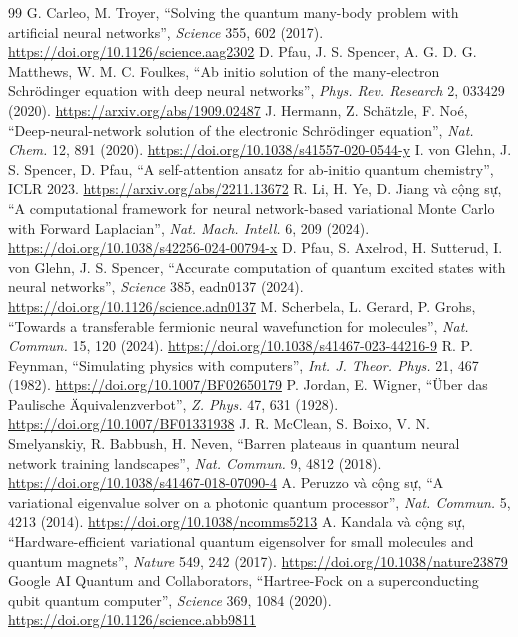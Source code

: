 {\begin{thebibliography}{99}
 G. Carleo, M. Troyer, ``Solving the quantum many-body problem with artificial neural networks'', \emph{Science} 355, 602 (2017). \url{https://doi.org/10.1126/science.aag2302}
 D. Pfau, J. S. Spencer, A. G. D. G. Matthews, W. M. C. Foulkes, ``Ab initio solution of the many-electron Schrödinger equation with deep neural networks'', \emph{Phys. Rev. Research} 2, 033429 (2020). \url{https://arxiv.org/abs/1909.02487}
 J. Hermann, Z. Schätzle, F. Noé, ``Deep-neural-network solution of the electronic Schrödinger equation'', \emph{Nat. Chem.} 12, 891 (2020). \url{https://doi.org/10.1038/s41557-020-0544-y}
 I. von Glehn, J. S. Spencer, D. Pfau, ``A self-attention ansatz for ab-initio quantum chemistry'', ICLR 2023. \url{https://arxiv.org/abs/2211.13672}
 R. Li, H. Ye, D. Jiang và cộng sự, ``A computational framework for neural network-based variational Monte Carlo with Forward Laplacian'', \emph{Nat. Mach. Intell.} 6, 209 (2024). \url{https://doi.org/10.1038/s42256-024-00794-x}
 D. Pfau, S. Axelrod, H. Sutterud, I. von Glehn, J. S. Spencer, ``Accurate computation of quantum excited states with neural networks'', \emph{Science} 385, eadn0137 (2024). \url{https://doi.org/10.1126/science.adn0137}
 M. Scherbela, L. Gerard, P. Grohs, ``Towards a transferable fermionic neural wavefunction for molecules'', \emph{Nat. Commun.} 15, 120 (2024). \url{https://doi.org/10.1038/s41467-023-44216-9}
 R. P. Feynman, ``Simulating physics with computers'', \emph{Int. J. Theor. Phys.} 21, 467 (1982). \url{https://doi.org/10.1007/BF02650179}
 P. Jordan, E. Wigner, ``Über das Paulische Äquivalenzverbot'', \emph{Z. Phys.} 47, 631 (1928). \url{https://doi.org/10.1007/BF01331938}
 J. R. McClean, S. Boixo, V. N. Smelyanskiy, R. Babbush, H. Neven, ``Barren plateaus in quantum neural network training landscapes'', \emph{Nat. Commun.} 9, 4812 (2018). \url{https://doi.org/10.1038/s41467-018-07090-4}
 A. Peruzzo và cộng sự, ``A variational eigenvalue solver on a photonic quantum processor'', \emph{Nat. Commun.} 5, 4213 (2014). \url{https://doi.org/10.1038/ncomms5213}
 A. Kandala và cộng sự, ``Hardware-efficient variational quantum eigensolver for small molecules and quantum magnets'', \emph{Nature} 549, 242 (2017). \url{https://doi.org/10.1038/nature23879}
 Google AI Quantum and Collaborators, ``Hartree-Fock on a superconducting qubit quantum computer'', \emph{Science} 369, 1084 (2020). \url{https://doi.org/10.1126/science.abb9811}

\end{thebibliography}}
